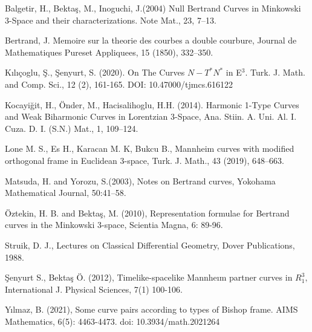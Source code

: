 \documentclass{article}
\begin{document}
\begin{thebibliography}{99}
 Balgetir, H., Bekta\c{s}, M., Inoguchi, J.(2004) Null
Bertrand Curves in Minkowski 3-Space and their characterizations. Note Mat.,
23, 7--13.

 Bertrand, J. Memoire sur la theorie des courbes a double
courbure, Journal de Mathematiques Pureset Appliquees, 15 (1850), 332--350.

 K\i l\i \c{c}oglu, \c{S}., \c{S}enyurt, S. (2020). On
The Curves $N-T^{\ast }N^{\ast }$ in E$^{3}$. Turk. J. Math. and Comp. Sci.,
12 (2), 161-165. DOI: 10.47000/tjmcs.616122

 Kocayi\u{g}it, H., \"{O}nder, M., Hacisalihoglu, H.H.
(2014). Harmonic 1-Type Curves and Weak Biharmonic Curves in Lorentzian
3-Space, Ana. Stiin. A. Uni. Al. I. Cuza. D. I. (S.N.) Mat., 1, 109--124.

 Lone M. S., Es H., Karacan M. K, Bukcu B., Mannheim curves with
modified orthogonal frame in Euclidean 3-space, Turk. J. Math., 43 (2019),
648--663.

 Matsuda, H. and Yorozu, S.(2003), Notes on Bertrand
curves, Yokohama Mathematical Journal, 50:41--58.

 \"{O}ztekin, H. B. and Bekta\c{s}, M. (2010),
Representation formulae for Bertrand curves in the Minkowski 3-space,
Scientia Magna, 6: 89-96.

 Struik, D. J., Lectures on Classical Differential Geometry,
Dover Publications, 1988.

 \c{S}enyurt S., Bekta\c{s} \"{O}. (2012),
Timelike-spacelike Mannhe\i m partner curves in $R_{1}^{3},$International J.
Physical Sciences, 7(1) 100-106.

 Y\i lmaz, B. (2021), Some curve pairs according to types of
Bishop frame. AIMS Mathematics, 6(5): 4463-4473. doi: 10.3934/math.2021264
\end{thebibliography}
\end{document}
